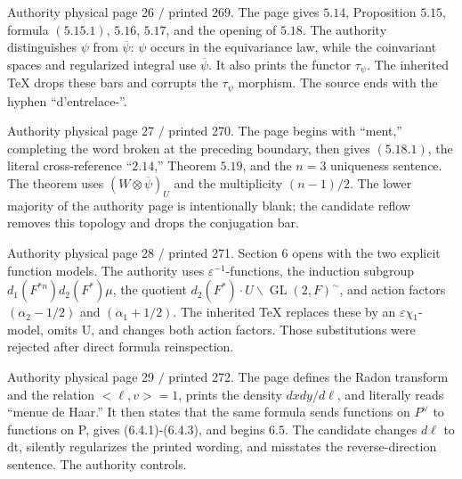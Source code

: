 \documentclass[10pt,a4paper]{article}
\begin{document}
\clearpage
{}
\label{d035-physical-026}
\par Authority physical page 26 $/$ printed 269. The page gives $5.14$, Proposition $5.15$, formula $(5.15.1)$, $5.16$, $5.17$, and the opening of $5.18$. The authority distinguishes $\psi{}$ from $\overline{\psi{}}$: $\psi{}$ occurs in the equivariance law, while the coinvariant spaces and regularized integral use $\overline{\psi{}}$. It also prints the functor $\tau{}_\psi{}$. The inherited TeX drops these bars and corrupts the $\tau{}_\psi{}$ morphism. The source ends with the hyphen ``d'entrelace-''.\par

\clearpage
{}
\label{d035-physical-027}
\par Authority physical page 27 $/$ printed 270. The page begins with ``ment,'' completing the word broken at the preceding boundary, then gives $(5.18.1)$, the literal cross-reference ``$2.14$,'' Theorem $5.19$, and the $n=3$ uniqueness sentence. The theorem uses $(W\otimes{}\overline{\psi{}})_U$ and the multiplicity $(n-1)/2$. The lower majority of the authority page is intentionally blank; the candidate reflow removes this topology and drops the conjugation bar.\par

\clearpage
{}
\label{d035-physical-028}
\par Authority physical page 28 $/$ printed 271. Section 6 opens with the two explicit function models. The authority uses $\varepsilon{}^{-1}$-functions, the induction subgroup $d_1(F^{*n})d_2(F^*)\mu{}$, the quotient $d_2(F^*)\cdot{}U\backslash \operatorname{GL}(2,F)^\sim$, and action factors $(\alpha{}_2-1/2)$ and $(\alpha{}_1+1/2)$. The inherited TeX replaces these by an $\varepsilon{}\chi{}_1$-model, omits U, and changes both action factors. Those substitutions were rejected after direct formula reinspection.\par

\clearpage
{}
\label{d035-physical-029}
\par Authority physical page 29 $/$ printed 272. The page defines the Radon transform and the relation $<\ell{},v>=1$, prints the density $dxdy/d\ell{}$, and literally reads ``menue de Haar.'' It then states that the same formula sends functions on $P^\vee{}$ to functions on P, gives (6.4.1)-(6.4.3), and begins $6.5$. The candidate changes $d\ell{}$ to dt, silently regularizes the printed wording, and misstates the reverse-direction sentence. The authority controls.\par
\end{document}
